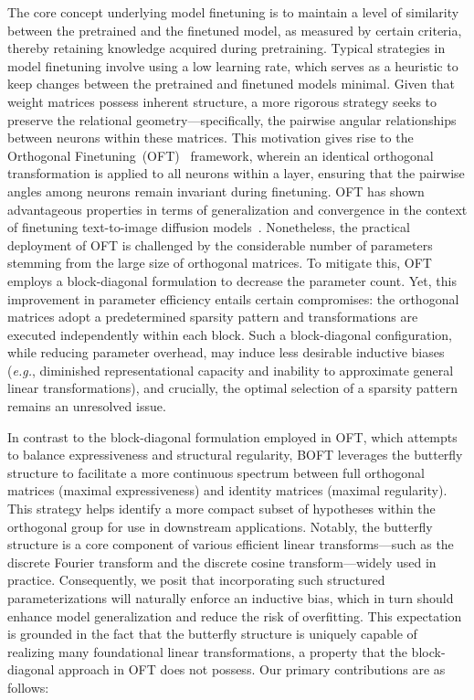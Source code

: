 The core concept underlying model finetuning is to maintain a level of similarity between the pretrained and the finetuned model, as measured by certain criteria, thereby retaining knowledge acquired during pretraining. Typical strategies in model finetuning involve using a low learning rate, which serves as a heuristic to keep changes between the pretrained and finetuned models minimal. Given that weight matrices possess inherent structure, a more rigorous strategy seeks to preserve the relational geometry—specifically, the pairwise angular relationships between neurons within these matrices. This motivation gives rise to the Orthogonal Finetuning~(OFT)~\cite{qiu2023controlling} framework, wherein an identical orthogonal transformation is applied to all neurons within a layer, ensuring that the pairwise angles among neurons remain invariant during finetuning. OFT has shown advantageous properties in terms of generalization and convergence in the context of finetuning text-to-image diffusion models~\cite{qiu2023controlling}. Nonetheless, the practical deployment of OFT is challenged by the considerable number of parameters stemming from the large size of orthogonal matrices. To mitigate this, OFT employs a block-diagonal formulation to decrease the parameter count. Yet, this improvement in parameter efficiency entails certain compromises: the orthogonal matrices adopt a predetermined sparsity pattern and transformations are executed independently within each block. Such a block-diagonal configuration, while reducing parameter overhead, may induce less desirable inductive biases (\emph{e.g.}, diminished representational capacity and inability to approximate general linear transformations), and crucially, the optimal selection of a sparsity pattern remains an unresolved issue.

In contrast to the block-diagonal formulation employed in OFT, which attempts to balance expressiveness and structural regularity, BOFT leverages the butterfly structure to facilitate a more continuous spectrum between full orthogonal matrices (maximal expressiveness) and identity matrices (maximal regularity). This strategy helps identify a more compact subset of hypotheses within the orthogonal group for use in downstream applications. Notably, the butterfly structure is a core component of various efficient linear transforms—such as the discrete Fourier transform and the discrete cosine transform—widely used in practice. Consequently, we posit that incorporating such structured parameterizations will naturally enforce an inductive bias, which in turn should enhance model generalization and reduce the risk of overfitting. This expectation is grounded in the fact that the butterfly structure is uniquely capable of realizing many foundational linear transformations, a property that the block-diagonal approach in OFT does not possess. Our primary contributions are as follows:

